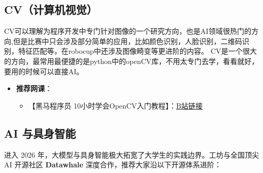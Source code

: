 \documentclass[a4paper,11pt,oneside]{scrreprt}
\begin{document}
\subsection{CV（计算机视觉）}

CV可以理解为程序开发中专门针对图像的一个研究方向，也是AI领域很热门的方向,但是比赛中只会涉及部分简单的应用，比如颜色识别，人脸识别，二维码识别，特征匹配等，在robocup中还涉及图像畸变等更进阶的内容。
CV是一个很大的方向，最常用最便捷的是python中的openCV库，不用太专门去学，看看就好，要用的时候可以直接AI。

\begin{itemize}
    \item \textbf{推荐网课}：
    \begin{itemize}
        \item 【黑马程序员 10小时学会OpenCV入门教程】：\href{https://www.bilibili.com/video/BV1Fo4y1d7JL/}{\underline{B站链接}}
    \end{itemize}
\end{itemize}

\subsection{AI 与具身智能}

进入 2026 年，大模型与具身智能极大拓宽了大学生的实践边界。工坊与全国顶尖 AI 开源社区 \textbf{Datawhale} 深度合作，推荐大家沿以下开源体系进阶：
\end{document}
